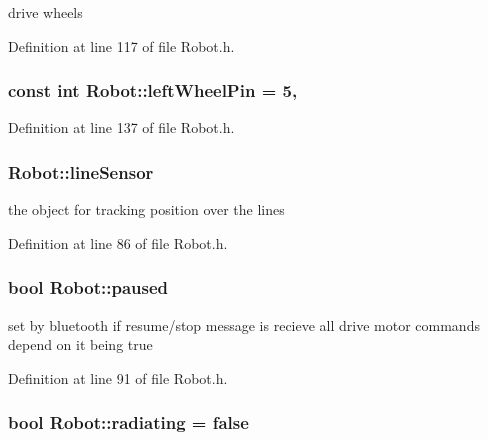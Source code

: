 drive wheels 



Definition at line 117 of file Robot.\-h.

\hypertarget{classRobot_a46298d7fb4c8c3932221c6a5ac14af9d}{
\subsubsection[{left\-Wheel\-Pin}]{\setlength{\rightskip}{0pt plus 5cm}const int Robot\-::left\-Wheel\-Pin = 5\hspace{0.3cm}{\ttfamily [static]}, {\ttfamily [private]}}}\label{classRobot_a46298d7fb4c8c3932221c6a5ac14af9d}


Definition at line 137 of file Robot.\-h.

\hypertarget{classRobot_abdc300045bea9a31013b25682629752d}{
\subsubsection[{line\-Sensor}]{ Robot\-::line\-Sensor}}\label{classRobot_abdc300045bea9a31013b25682629752d}


the object for tracking position over the lines 



Definition at line 86 of file Robot.\-h.

\hypertarget{classRobot_a6a1fae6e6ee0a3298b9e60d3f50ad12a}{
\subsubsection[{paused}]{\setlength{\rightskip}{0pt plus 5cm}bool Robot\-::paused}}\label{classRobot_a6a1fae6e6ee0a3298b9e60d3f50ad12a}


set by bluetooth if resume/stop message is recieve all drive motor commands depend on it being true 



Definition at line 91 of file Robot.\-h.

\hypertarget{classRobot_a77f62d85ab1cf34e79c2a3acd470a4ce}{
\subsubsection[{radiating}]{\setlength{\rightskip}{0pt plus 5cm}bool Robot\-::radiating = false}}\label{classRobot_a77f62d85ab1cf34e79c2a3acd470a4ce}


